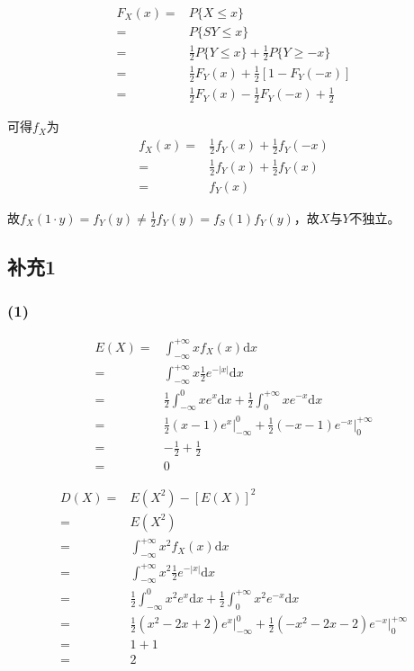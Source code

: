 \documentclass[a4paper,12pt]{ctexart}
\begin{document}
\begin{align*}
	F_X(x) =& P\{X \leq x\} \\
		 =& P\{SY \leq x\} \\
		 =& \frac{1}{2} P\{Y \leq x\} + \frac{1}{2} P\{Y \geq -x\} \\
		 =& \frac{1}{2} F_Y(x) + \frac{1}{2} [1 - F_Y(-x)] \\
		 =& \frac{1}{2} F_Y(x) - \frac{1}{2} F_Y(-x) + \frac{1}{2}
\end{align*}

可得$f_X$为
\begin{align*}
	f_X(x) =& \frac{1}{2} f_Y(x) + \frac{1}{2} f_Y(-x) \\
		   =& \frac{1}{2} f_Y(x) + \frac{1}{2} f_Y(x) \\
		   =& f_Y(x)
\end{align*}

故$f_X(1 \cdot y) = f_Y(y) \neq \frac{1}{2} f_Y(y) = f_S(1) f_Y(y)$，故$X$与$Y$不独立。

\subsection*{补充1}

\subsubsection*{(1)}

\begin{align*}
	E(X) =& \int_{-\infty}^{+\infty} x f_X(x) \mathrm{d}x \\
		 =& \int_{-\infty}^{+\infty} x \frac{1}{2} e^{-|x|} \mathrm{d}x \\
		 =& \frac{1}{2} \int_{-\infty}^{0} x e^x \mathrm{d}x + \frac{1}{2} \int_{0}^{+\infty} x e^{-x} \mathrm{d}x \\
		 =& \frac{1}{2} (x-1) e^x \bigg|_{-\infty}^{0} + \frac{1}{2} (-x-1) e^{-x} \bigg|_{0}^{+\infty} \\
		 =& - \frac{1}{2} + \frac{1}{2} \\
		 =& 0
\end{align*}

\begin{align*}
	D(X) =& E(X^2) - [E(X)]^2 \\
		 =& E(X^2) \\
		 =& \int_{-\infty}^{+\infty} x^2 f_X(x) \mathrm{d}x \\
		 =& \int_{-\infty}^{+\infty} x^2 \frac{1}{2} e^{-|x|} \mathrm{d}x \\
		 =& \frac{1}{2} \int_{-\infty}^{0} x^2 e^x \mathrm{d}x + \frac{1}{2} \int_{0}^{+\infty} x^2 e^{-x} \mathrm{d}x \\
		 =& \frac{1}{2} (x^2-2x+2) e^x \bigg|_{-\infty}^{0} + \frac{1}{2} (-x^2-2x-2) e^{-x} \bigg|_{0}^{+\infty} \\
		 =& 1 + 1 \\
		 =& 2
\end{align*}
\end{document}

